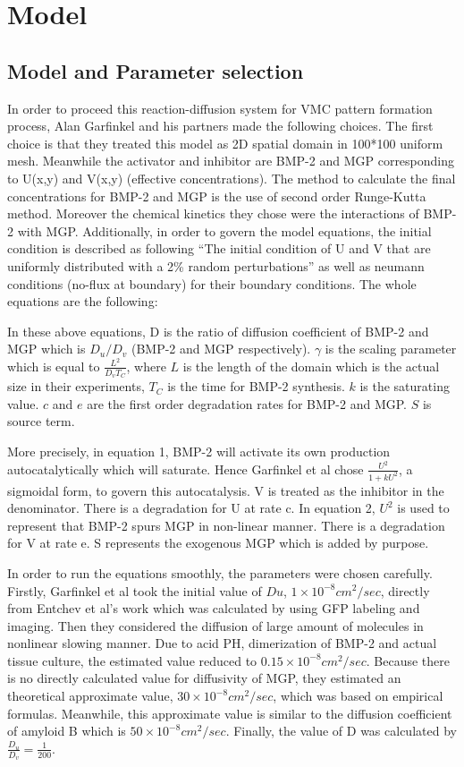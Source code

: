 \documentclass{article}
\begin{document}
	\section{Model}
	
	

\subsection{Model and Parameter selection}

In order to proceed this reaction-diffusion system for VMC pattern formation process, Alan Garfinkel and his partners made the following choices. The first choice is that they treated this model as 2D spatial domain in 100*100 uniform mesh. Meanwhile the activator and inhibitor are BMP-2 and MGP corresponding to U(x,y) and V(x,y) (effective concentrations). The method to calculate the final concentrations for BMP-2 and MGP is the use of second order Runge-Kutta method. Moreover the chemical kinetics they chose were the interactions of BMP-2 with MGP. Additionally, in order to govern the model equations, the initial condition is described as following “The initial condition of U and V that are uniformly distributed with a 2\% random perturbations” as well as neumann conditions (no-flux at boundary) for their boundary conditions. The whole equations are the following:

In these above equations, D is the ratio of diffusion coefficient of BMP-2 and MGP which is $D_u / D_v$ (BMP-2 and MGP respectively). $\gamma$ is the scaling parameter which is equal to $\frac{L^2}{D_v T_C}$, where $L$ is the length of the domain which is the actual size in their experiments, $T_C$ is the time for BMP-2 synthesis. $k$ is the saturating value. $c$ and $e$ are the first order degradation rates for BMP-2 and MGP. $S$ is source term.

More precisely, in equation 1, BMP-2 will activate its own production autocatalytically which will saturate. Hence Garfinkel et al chose $\frac{U^2}{1+k U^2}$, a sigmoidal form, to govern this autocatalysis. V is treated as the inhibitor in the denominator. There is a degradation for U at rate c. In equation 2, $U^2$ is used to represent that BMP-2 spurs MGP in non-linear manner. There is a degradation for V at rate e. S represents the exogenous MGP which is added by purpose.

In order to run the equations smoothly, the parameters were chosen carefully. Firstly, Garfinkel et al took the initial value of $Du$, $1 \times 10^{-8} cm^2/sec$, directly from Entchev et al’s work which was calculated by using GFP labeling and imaging. Then they considered the diffusion of large amount of molecules in nonlinear slowing manner. Due to acid PH, dimerization of BMP-2 and actual tissue culture, the estimated value reduced to $0.15 \times 10^{-8} cm^2/sec$. Because there is no directly calculated value for diffusivity of MGP, they estimated an theoretical approximate value, $30 \times 10^{-8} cm^2/sec$, which was based on empirical formulas. Meanwhile, this approximate value is similar to the diffusion coefficient of amyloid B which is $50 \times 10^{-8} cm^2/sec$. Finally, the value of D was calculated by $\frac{D_u}{D_v} = \frac{1}{200}$.
\end{document}
